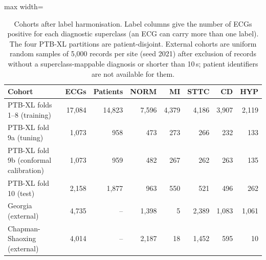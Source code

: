 \begin{table}[!htbp]
\centering\small
\caption{Cohorts after label harmonisation. Label columns give the number of ECGs positive for each diagnostic superclass (an ECG can carry more than one label). The four PTB-XL partitions are patient-disjoint. External cohorts are uniform random samples of 5,000 records per site (seed 2021) after exclusion of records without a superclass-mappable diagnosis or shorter than 10\,s; patient identifiers are not available for them.}
\label{tab:cohorts}
\setlength{\tabcolsep}{4pt}
\begin{adjustbox}{max width=\linewidth}
\begin{tabular}{lrrrrrrr}
\toprule
Cohort & ECGs & Patients & NORM & MI & STTC & CD & HYP \\
\midrule
PTB-XL folds 1--8 (training) & 17,084 & 14,823 & 7,596 & 4,379 & 4,186 & 3,907 & 2,119 \\
PTB-XL fold 9a (tuning) & 1,073 & 958 & 473 & 273 & 266 & 232 & 133 \\
PTB-XL fold 9b (conformal calibration) & 1,073 & 959 & 482 & 267 & 262 & 263 & 135 \\
PTB-XL fold 10 (test) & 2,158 & 1,877 & 963 & 550 & 521 & 496 & 262 \\
\midrule
Georgia (external) & 4,735 & -- & 1,398 & 5 & 2,389 & 1,083 & 1,061 \\
Chapman-Shaoxing (external) & 4,014 & -- & 2,187 & 18 & 1,452 & 595 & 10 \\
\bottomrule
\end{tabular}
\end{adjustbox}
\end{table}
